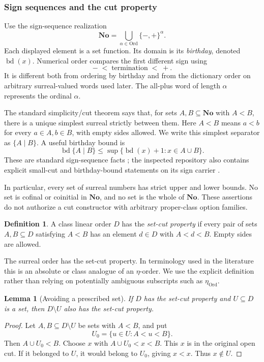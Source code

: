 \documentclass[11pt]{article}
\newtheorem{lemma}[lemma]{Lemma}
\theoremstyle{definition}
\newtheorem{definition}[definition]{Definition}
\theoremstyle{remark}
\newcommand{\No}{\mathbf{No}}
\newcommand{\Ord}{\mathrm{Ord}}
\newcommand{\bd}{\operatorname{bd}}
\begin{document}
\subsubsection{Sign sequences and the cut property}
Use the sign-sequence realization
\[
   \No=\bigcup_{\alpha\in\Ord}\{-,+\}^{\alpha}.
\]
Each displayed element is a set function. Its domain is its
\emph{birthday}, denoted $\bd(x)$. Numerical order compares the first
different sign using
\[
                  -\;<\;\text{termination}\;<\;+.
\]
It is different both from ordering by birthday and from the dictionary
order on arbitrary surreal-valued words used later. The all-plus word
of length $\alpha$ represents the ordinal $\alpha$.

The standard simplicity/cut theorem says that, for sets $A,B\subseteq\No$
with $A<B$, there is a unique simplest surreal strictly between them.
Here $A<B$ means $a<b$ for every $a\in A,b\in B$, with empty sides
allowed. We write this simplest separator as $\{A\mid B\}$. A useful
birthday bound is
\begin{equation}
 \bd\{A\mid B\}\le
       \sup\{\bd(x)+1:x\in A\cup B\}.
 \label{swo:ec:eq:cut-birthday}
\end{equation}
These are standard sign-sequence facts \cite{Gonshor}; the inspected
repository also contains explicit small-cut and birthday-bound
statements on its sign carrier \cite{ProveItCuts}.

In particular, every set of surreal numbers has strict upper and lower
bounds. No set is cofinal or coinitial in $\No$, and no set is the whole
of $\No$. These assertions do not authorize a cut constructor with
arbitrary proper-class option families.

\begin{definition}\label{swo:ec:n2.1}
A class linear order $D$ has the \emph{set-cut property} if every pair of
sets $A,B\subseteq D$ satisfying $A<B$ has an element $d\in D$ with
$A<d<B$. Empty sides are allowed.
\end{definition}
The surreal order has the set-cut property. In terminology used in the
literature this is an absolute or class analogue of an $\eta$-order.
We use the explicit definition rather than relying on potentially
ambiguous subscripts such as $\eta_{\Ord}$.

\begin{lemma}[Avoiding a prescribed set]\label{swo:ec:lem:avoid}
If $D$ has the set-cut property and $U\subseteq D$ is a set, then
$D\setminus U$ also has the set-cut property.
\end{lemma}
\begin{proof}
Let $A,B\subseteq D\setminus U$ be sets with $A<B$, and put
\[
 U_0=\{u\in U:A<u<B\}.
\]
Then $A\cup U_0<B$. Choose $x$ with $A\cup U_0<x<B$. This $x$ is in the
original open cut. If it belonged to $U$, it would belong to $U_0$, giving
$x<x$. Thus $x\notin U$.
\end{proof}
\end{document}
